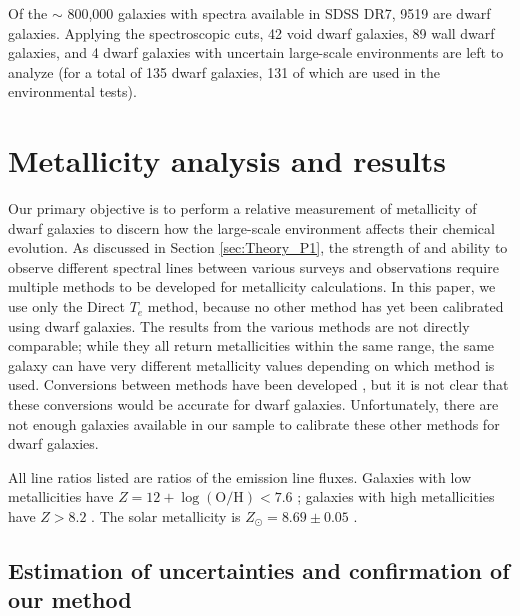 Of the $\sim$ 800,000 galaxies with spectra available in SDSS DR7, 9519 are 
dwarf galaxies.  Applying the spectroscopic cuts, 42 void dwarf galaxies, 89 
wall dwarf galaxies, and 4 dwarf galaxies with uncertain large-scale 
environments are left to analyze (for a total of 135 dwarf galaxies, 131 of 
which are used in the environmental tests).


\section[Analysis \& Results]{Metallicity analysis and results}

Our primary objective is to perform a relative measurement of metallicity of 
dwarf galaxies to discern how the large-scale environment affects their chemical 
evolution.  As discussed in Section \ref{sec:Theory_P1}, the strength of and 
ability to observe different spectral lines between various surveys and 
observations require multiple methods to be developed for metallicity 
calculations.  In this paper, we use only the Direct $T_e$ method, because no 
other method has yet been calibrated using dwarf galaxies.  The results from the 
various methods are not directly comparable; while they all return metallicities 
within the same range, the same galaxy can have very different metallicity 
values depending on which method is used.  Conversions between methods have been 
developed \citep[see][]{Kewley08}, but it is not clear that these conversions 
would be accurate for dwarf galaxies.  Unfortunately, there are not enough 
galaxies available in our sample to calibrate these other methods for dwarf 
galaxies.  

All line ratios listed are ratios of the emission line fluxes.  Galaxies with 
low metallicities have $Z = 12 + \log (\text{O}/\text{H}) < 7.6$ 
\citep{Pustilnik06}; galaxies with high metallicities have $Z > 8.2$ 
\citep{Pilyugin06}.  The solar metallicity is $Z_{\odot} = 8.69\pm 0.05$ 
\citep{Asplund09}.


\subsection{Estimation of uncertainties and confirmation of our method}

